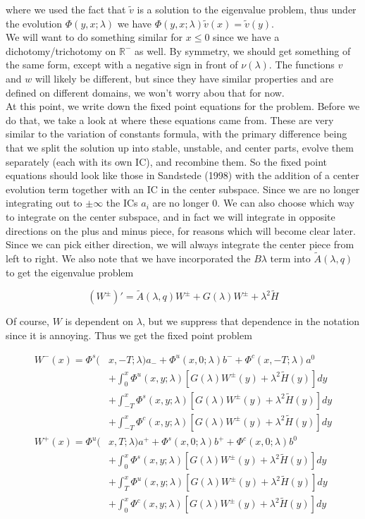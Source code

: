 \documentclass[12pt]{article}
\def\R{{\mathbb R}}
\begin{document}
where we used the fact that $\tilde{v}$ is a solution to the eigenvalue problem, thus under the evolution $\Phi(y, x; \lambda)$ we have $\Phi(y, x; \lambda)\tilde{v}(x) = \tilde{v}(y)$.\\

We will want to do something similar for $x \leq 0$ since we have a dichotomy/trichotomy on $\R^-$ as well. By symmetry, we should get something of the same form, except with a negative sign in front of $\nu(\lambda)$. The functions $v$ and $w$ will likely be different, but since they have similar properties and are defined on different domains, we won't worry abou that for now.\\

At this point, we write down the fixed point equations for the problem. Before we do that, we take a look at where these equations came from. These are very similar to the variation of constants formula, with the primary difference being that we split the solution up into stable, unstable, and center parts, evolve them separately (each with its own IC), and recombine them. So the fixed point equations should look like those in Sandstede (1998) with the addition of a center evolution term together with an IC in the center subspace. Since we are no longer integrating out to $\pm \infty$ the ICs $a_i$ are no longer 0. We can also choose which way to integrate on the center subspace, and in fact we will integrate in opposite directions on the plus and minus piece, for reasons which will become clear later. Since we can pick either direction, we will always integrate the center piece from left to right. We also note that we have incorporated the $B \lambda$ term into $\tilde{A}(\lambda, q)$ to get the eigenvalue problem

\[
(W^\pm)' = \tilde{A}(\lambda, q) W^\pm + G(\lambda)W^\pm + \lambda^2 \tilde{H}
\]

Of course, $W$ is dependent on $\lambda$, but we suppress that dependence in the notation since it is annoying. Thus we get the fixed point problem

\begin{align*}
W^-(x) = \Phi^s(&x, -T; \lambda)a_- + \Phi^u(x, 0; \lambda)b^- + \Phi^c(x, -T; \lambda)a^0 \\
&+ \int_0^x \Phi^u(x, y; \lambda)[ G(\lambda)W^\pm(y) + \lambda^2 \tilde{H}(y) ] dy \\
&+ \int_{-T}^x \Phi^s(x, y; \lambda) [ G(\lambda)W^\pm(y) + \lambda^2 \tilde{H}(y) ] dy \\
&+ \int_{-T}^x \Phi^c(x, y; \lambda) [ G(\lambda)W^\pm(y) + \lambda^2 \tilde{H}(y) ]dy \\
W^+(x) = \Phi^u(&x, T; \lambda)a^+ + \Phi^s(x, 0; \lambda)b^+ + \Phi^c(x, 0; \lambda)b^0 \\
&+ \int_0^x \Phi^s(x, y; \lambda) [ G(\lambda)W^\pm(y) + \lambda^2 \tilde{H}(y) ] dy \\
&+ \int_T^x \Phi^u(x, y; \lambda) [ G(\lambda)W^\pm(y) + \lambda^2 \tilde{H}(y) ] dy \\
&+ \int_0^x \Phi^c(x, y; \lambda) [ G(\lambda)W^\pm(y) + \lambda^2 \tilde{H}(y) ] dy
\end{align*}
\end{document}
